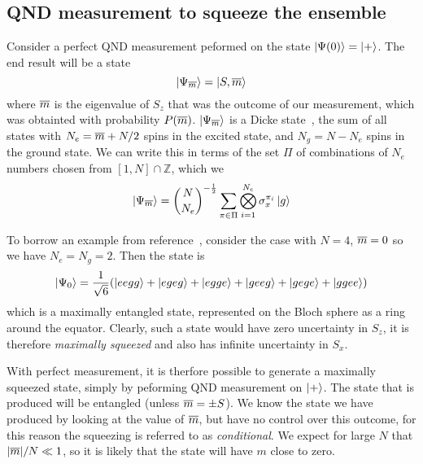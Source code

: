 \subsection{QND measurement to squeeze the ensemble}



Consider a perfect QND measurement peformed on the state $\ket{\Psi(0)} =
\ket{+}$. The end result will be a state
%
\begin{equation}
  \ket{\Psi_{\overline{m}}} = \ket{S, \overline{m}}
\end{equation}
%
where $\overline{m}$ is the eigenvalue of $S_z$ that was the outcome of our
measurement, which was obtainted with probability $P(\overline{m})$.
$\ket{\Psi_{\overline{m}}}$ is a Dicke state~\cite{Baertschi2019}, the sum of all
states with $N_e = \overline{m} + N/2$ spins in the excited state, and $N_g = N -
N_e$ spins in the ground state.  We can write this in terms of the set $\Pi$ of
combinations of $N_e$ numbers chosen from $[1,N]\cap\mathbb{Z}$, which we
%
\begin{equation}
  \ket{\Psi_{\overline{m}}} = {N \choose N_e}^{-\frac{1}{2}}\sum_{\pi \in \Pi}
  \bigotimes_{i=1}^{N_e} \sigma_x^{\pi_i} \ket{g}
\end{equation}

To borrow an example from
reference~\cite{Cox2016}, consider the case with $N=4$, $\overline{m}=0$ so we have
$N_e = N_g = 2$. Then the state is
%
\begin{equation}
  \ket{\Psi_0} = \frac{1}{\sqrt{6}}(\ket{eegg} + \ket{egeg} + \ket{egge} +
  \ket{geeg} + \ket{gege} + \ket{ggee})
\end{equation}
%
which is a maximally entangled state, represented on the Bloch sphere as a ring
around the equator.
%
Clearly, such a state would have zero uncertainty in $S_z$, it is therefore
\emph{maximally squeezed}
and also has infinite uncertainty in $S_x$.

With perfect measurement, it is therfore possible to generate a maximally
squeezed state, simply by peforming QND measurement on  $\ket{+}$. The state
that is produced will be entangled (unless $\overline{m} = \pm S$). We know the
state we have produced by looking at the value of $\overline{m}$, but have no
control over this outcome, for this reason the squeezing is referred to as
\emph{conditional}.
%
We expect for large $N$ that $|\overline{m}|/N \ll 1$, so it is likely that the
state will have $m$ close to zero.

